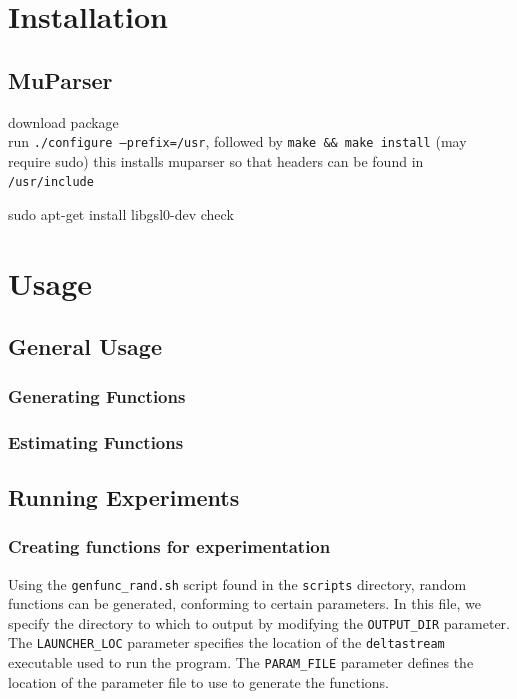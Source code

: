 \documentclass[a4paper,11pt]{article}
\begin{document}
\begin{appendices}
\section{Installation}
\label{sec-10}
\subsection{MuParser}
\label{sec-10-1}

 download package\\
 run \texttt{./configure --prefix=/usr}, followed by \texttt{make \&\& make install} (may require sudo)
 this installs muparser so that headers can be found in \texttt{/usr/include}
 \begin{verbatimtab}   
 sudo apt-get install libgsl0-dev check 
 \end{verbatimtab}
\section{Usage}
\label{sec-11}
\subsection{General Usage}
\label{sec-11-1}
\subsubsection{Generating Functions}
\label{sec-11-1-1}
\subsubsection{Estimating Functions}
\label{sec-11-1-2}
\subsection{Running Experiments}
\label{sec-11-2}
\subsubsection{Creating functions for experimentation}
\label{sec-11-2-1}

Using the \texttt{genfunc\_rand.sh} script found in the \texttt{scripts} directory, random
functions can be generated, conforming to certain parameters. In this file,
we specify the directory to which to output by modifying the
\texttt{OUTPUT\_DIR} parameter. The \texttt{LAUNCHER\_LOC} parameter specifies the
location of the \texttt{deltastream} executable used to run the program. The
\texttt{PARAM\_FILE} parameter defines the location of the parameter file to use
to generate the functions.


\end{appendices}
\end{document}
